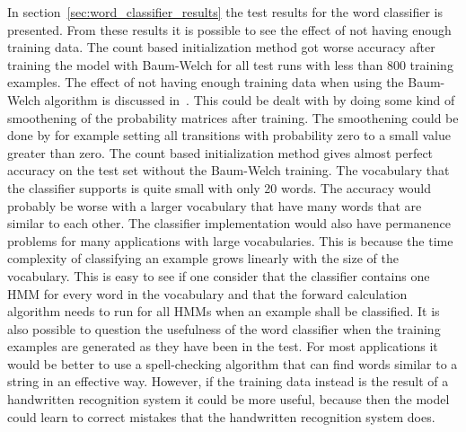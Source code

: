 In section~\ref{sec:word_classifier_results} the test results for the word classifier is presented.
From these results it is possible to see the effect of not having enough training data.
The count based initialization method got worse accuracy after training the model with Baum-Welch for all test runs with less than 800 training examples.
The effect of not having enough training data when using the Baum-Welch algorithm is discussed in~\cite{Rabiner1989}.
This could be dealt with by doing some kind of smoothening of the probability matrices after training.
The smoothening could be done by for example setting all transitions with probability zero to a small value greater than zero.
The count based initialization method gives almost perfect accuracy on the test set without the Baum-Welch training.
The vocabulary that the classifier supports is quite small with only 20 words.
The accuracy would probably be worse with a larger vocabulary that have many words that are similar to each other.
The classifier implementation would also have permanence problems for many applications with large vocabularies.
This is because the time complexity of classifying an example grows linearly with the size of the vocabulary.
This is easy to see if one consider that the classifier contains one HMM for every word in the vocabulary and that the forward calculation algorithm needs to run for all HMMs when an example shall be classified.
It is also possible to question the usefulness of the word classifier when the training examples are generated as they have been in the test.
For most applications it would be better to use a spell-checking algorithm that can find words similar to a string in an effective way.
However, if the training data instead is the result of a handwritten recognition system it could be more useful, because then the model could learn to correct mistakes that the handwritten recognition system does.

